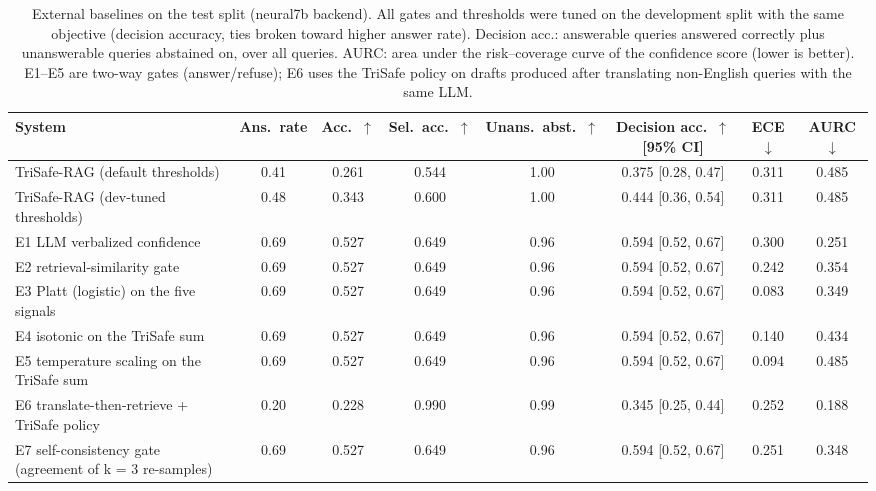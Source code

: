 \begin{table}[t]
  \caption{External baselines on the test split (neural7b backend). All gates and thresholds were tuned on the development split with the same objective (decision accuracy, ties broken toward higher answer rate). Decision acc.: answerable queries answered correctly plus unanswerable queries abstained on, over all queries. AURC: area under the risk--coverage curve of the confidence score (lower is better). E1--E5 are two-way gates (answer/refuse); E6 uses the TriSafe policy on drafts produced after translating non-English queries with the same LLM.}
  \label{tab:external-neural7b}
  \footnotesize
  \setlength{\tabcolsep}{4pt}
  \begin{tabular}{lccccccc}
    \toprule
    System & Ans.\ rate & Acc.\ $\uparrow$ & Sel.\ acc.\ $\uparrow$ & Unans.\ abst.\ $\uparrow$ & Decision acc.\ $\uparrow$ [95\% CI] & ECE $\downarrow$ & AURC $\downarrow$ \\
    \midrule
    TriSafe-RAG (default thresholds) & 0.41 & 0.261 & 0.544 & 1.00 & 0.375 [0.28, 0.47] & 0.311 & 0.485 \\
    TriSafe-RAG (dev-tuned thresholds) & 0.48 & 0.343 & 0.600 & 1.00 & 0.444 [0.36, 0.54] & 0.311 & 0.485 \\
    E1 LLM verbalized confidence & 0.69 & 0.527 & 0.649 & 0.96 & 0.594 [0.52, 0.67] & 0.300 & 0.251 \\
    E2 retrieval-similarity gate & 0.69 & 0.527 & 0.649 & 0.96 & 0.594 [0.52, 0.67] & 0.242 & 0.354 \\
    E3 Platt (logistic) on the five signals & 0.69 & 0.527 & 0.649 & 0.96 & 0.594 [0.52, 0.67] & 0.083 & 0.349 \\
    E4 isotonic on the TriSafe sum & 0.69 & 0.527 & 0.649 & 0.96 & 0.594 [0.52, 0.67] & 0.140 & 0.434 \\
    E5 temperature scaling on the TriSafe sum & 0.69 & 0.527 & 0.649 & 0.96 & 0.594 [0.52, 0.67] & 0.094 & 0.485 \\
    E6 translate-then-retrieve + TriSafe policy & 0.20 & 0.228 & 0.990 & 0.99 & 0.345 [0.25, 0.44] & 0.252 & 0.188 \\
    E7 self-consistency gate (agreement of k = 3 re-samples) & 0.69 & 0.527 & 0.649 & 0.96 & 0.594 [0.52, 0.67] & 0.251 & 0.348 \\
    \bottomrule
  \end{tabular}
\end{table}
